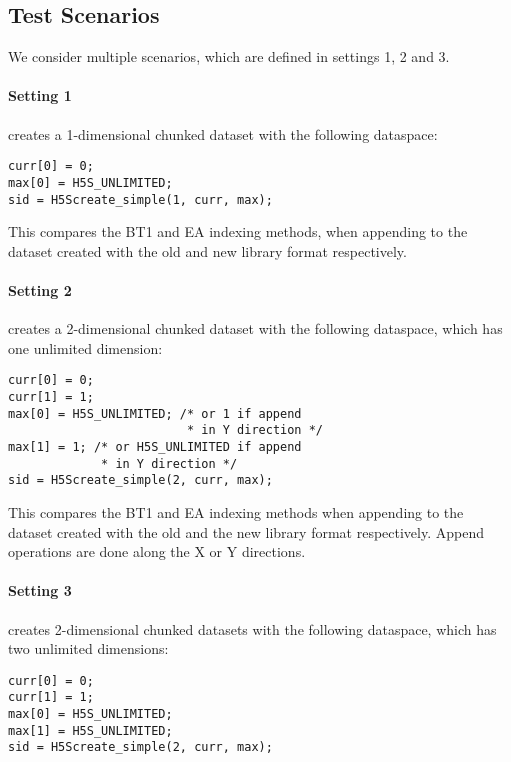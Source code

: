 \subsection{Test Scenarios}

We consider multiple scenarios, which are defined in settings 1, 2 and 3.

\paragraph{Setting 1}
creates a 1-dimensional chunked dataset with the following dataspace:

{
\begin{lstlisting}
curr[0] = 0;
max[0] = H5S_UNLIMITED;
sid = H5Screate_simple(1, curr, max);
\end{lstlisting}
}

This compares the BT1 and EA indexing methods, when appending to the dataset
created with the old and new library format respectively.

\paragraph{Setting 2} creates a 2-dimensional chunked dataset with the following
dataspace, which has one unlimited dimension:

{
\begin{lstlisting}
curr[0] = 0;
curr[1] = 1;
max[0] = H5S_UNLIMITED; /* or 1 if append
                         * in Y direction */
max[1] = 1; /* or H5S_UNLIMITED if append
             * in Y direction */
sid = H5Screate_simple(2, curr, max);
\end{lstlisting}
}

This compares the BT1 and EA indexing methods when appending to the dataset
created with the old and the new library format respectively.
Append operations are done along the X or Y directions.

\paragraph{Setting 3} creates 2-dimensional chunked datasets with the following
dataspace, which has two unlimited dimensions:

{
\begin{lstlisting}
curr[0] = 0;
curr[1] = 1;
max[0] = H5S_UNLIMITED;
max[1] = H5S_UNLIMITED;
sid = H5Screate_simple(2, curr, max);
\end{lstlisting}
}

